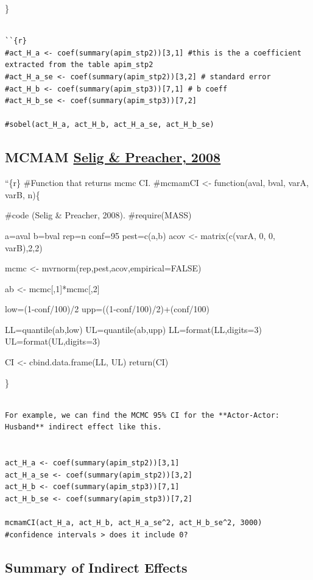 \documentclass[
  english,
  man,floatsintext]{apa6}
\begin{document}
\}

\begin{verbatim}

``{r}
#act_H_a <- coef(summary(apim_stp2))[3,1] #this is the a coefficient extracted from the table apim_stp2 
#act_H_a_se <- coef(summary(apim_stp2))[3,2] # standard error 
#act_H_b <- coef(summary(apim_stp3))[7,1] # b coeff
#act_H_b_se <- coef(summary(apim_stp3))[7,2]

#sobel(act_H_a, act_H_b, act_H_a_se, act_H_b_se)
\end{verbatim}

\hypertarget{mcmam-selig-preacher-2008}{%
\subsection{\texorpdfstring{MCMAM \href{http://www.quantpsy.org/medmc/medmc.htm}{Selig \& Preacher, 2008}}{MCMAM Selig \& Preacher, 2008}}\label{mcmam-selig-preacher-2008}}

``\{r\}
\#Function that returns mcmc CI.
\#mcmamCI \textless- function(aval, bval, varA, varB, n)\{

\#code (Selig \& Preacher, 2008).
\#require(MASS)

a=aval
b=bval
rep=n
conf=95
pest=c(a,b)
acov \textless- matrix(c(varA, 0, 0, varB),2,2)

mcmc \textless- mvrnorm(rep,pest,acov,empirical=FALSE)

ab \textless- mcmc{[},1{]}*mcmc{[},2{]}

low=(1-conf/100)/2
upp=((1-conf/100)/2)+(conf/100)

LL=quantile(ab,low)
UL=quantile(ab,upp)
LL=format(LL,digits=3)
UL=format(UL,digits=3)

CI \textless- cbind.data.frame(LL, UL)
return(CI)

\}

\begin{verbatim}

For example, we can find the MCMC 95% CI for the **Actor-Actor: Husband** indirect effect like this.


act_H_a <- coef(summary(apim_stp2))[3,1]
act_H_a_se <- coef(summary(apim_stp2))[3,2]
act_H_b <- coef(summary(apim_stp3))[7,1]
act_H_b_se <- coef(summary(apim_stp3))[7,2]

mcmamCI(act_H_a, act_H_b, act_H_a_se^2, act_H_b_se^2, 3000)
#confidence intervals > does it include 0?
\end{verbatim}

\hypertarget{summary-of-indirect-effects}{%
\subsection{Summary of Indirect Effects}\label{summary-of-indirect-effects}}
\end{document}
